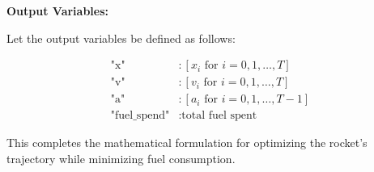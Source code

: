 \documentclass{article}
\begin{document}
\textbf{Output Variables:}

Let the output variables be defined as follows:

\[
\begin{align*}
\text{"x"} & : [x_i \text{ for } i = 0, 1, \ldots, T] \\
\text{"v"} & : [v_i \text{ for } i = 0, 1, \ldots, T] \\
\text{"a"} & : [a_i \text{ for } i = 0, 1, \ldots, T-1] \\
\text{"fuel\_spend"} & : \text{total fuel spent}
\end{align*}
\]

This completes the mathematical formulation for optimizing the rocket's trajectory while minimizing fuel consumption.
\end{document}
